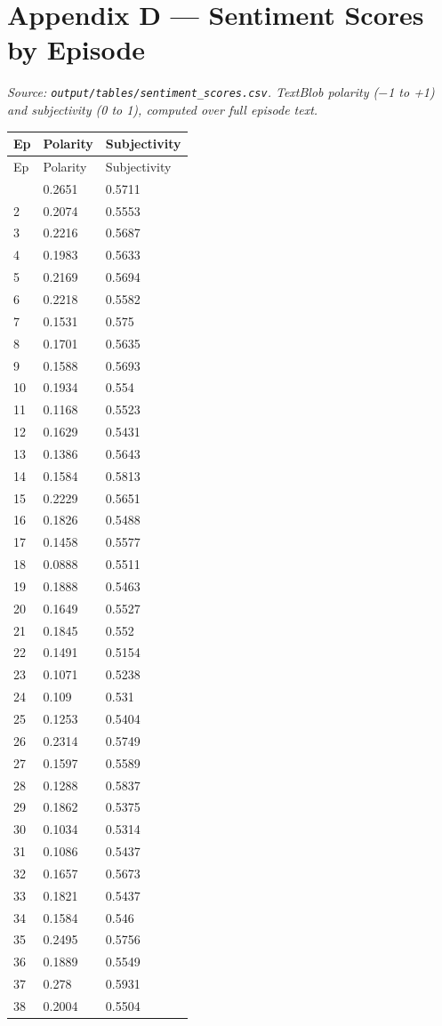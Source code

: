 \documentclass[11pt]{article}
\begin{document}
\section*{Appendix D --- Sentiment Scores by Episode}

\emph{Source: \texttt{output/tables/sentiment\_scores.csv}. TextBlob polarity ($-$1 to +1) and subjectivity (0 to 1), computed over full episode text.}

\small\setlength{\tabcolsep}{4pt}

\begin{longtable}{lll}
\toprule
Ep & Polarity & Subjectivity \\
\midrule
\endfirsthead
\toprule
Ep & Polarity & Subjectivity \\
\midrule
\endhead
\bottomrule
\endlastfoot
1 & 0.2651 & 0.5711 \\
2 & 0.2074 & 0.5553 \\
3 & 0.2216 & 0.5687 \\
4 & 0.1983 & 0.5633 \\
5 & 0.2169 & 0.5694 \\
6 & 0.2218 & 0.5582 \\
7 & 0.1531 & 0.575 \\
8 & 0.1701 & 0.5635 \\
9 & 0.1588 & 0.5693 \\
10 & 0.1934 & 0.554 \\
11 & 0.1168 & 0.5523 \\
12 & 0.1629 & 0.5431 \\
13 & 0.1386 & 0.5643 \\
14 & 0.1584 & 0.5813 \\
15 & 0.2229 & 0.5651 \\
16 & 0.1826 & 0.5488 \\
17 & 0.1458 & 0.5577 \\
18 & 0.0888 & 0.5511 \\
19 & 0.1888 & 0.5463 \\
20 & 0.1649 & 0.5527 \\
21 & 0.1845 & 0.552 \\
22 & 0.1491 & 0.5154 \\
23 & 0.1071 & 0.5238 \\
24 & 0.109 & 0.531 \\
25 & 0.1253 & 0.5404 \\
26 & 0.2314 & 0.5749 \\
27 & 0.1597 & 0.5589 \\
28 & 0.1288 & 0.5837 \\
29 & 0.1862 & 0.5375 \\
30 & 0.1034 & 0.5314 \\
31 & 0.1086 & 0.5437 \\
32 & 0.1657 & 0.5673 \\
33 & 0.1821 & 0.5437 \\
34 & 0.1584 & 0.546 \\
35 & 0.2495 & 0.5756 \\
36 & 0.1889 & 0.5549 \\
37 & 0.278 & 0.5931 \\
38 & 0.2004 & 0.5504 \\
\end{longtable}
\normalsize\setlength{\tabcolsep}{6pt}
\end{document}
